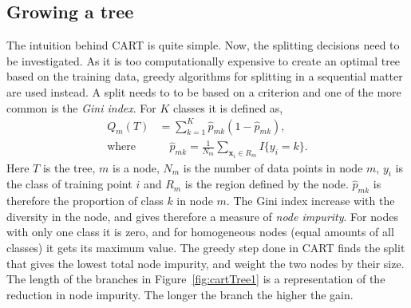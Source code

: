 \subsection{Growing a tree}
\label{sub:Growing a tree}
The intuition behind CART is quite simple. Now, the splitting decisions need to be investigated. As it is too computationally expensive to create an optimal tree based on the training data, greedy algorithms for splitting in a sequential matter are used instead. A split needs to to be based on a criterion and one of the more common is the \textit{Gini index}. For $K$ classes it is defined as,
\begin{align}
  Q_m(T) &= \sum^{K}_{k=1} \hat{p}_{mk} (1 - \hat{p}_{mk}),  \\ 
  \label{eq:pmk} 
  \text{where}& \quad \hat{p}_{mk} = \frac{1}{N_m} \sum_{\mathbf{x}_i \in R_m} I\{y_i = k\}.
\end{align}
Here $T$ is the tree, $m$ is a node, $N_m$ is the number of data points in node $m$, $y_i$ is the class of training point $i$ and $R_m$ is the region defined by the node.
$\hat{p}_{mk}$ is therefore the proportion of class $k$ in node $m$.
The Gini index increase with the diversity in the node, and gives therefore a measure of \textit{node impurity}. For nodes with only one class it is zero, and for homogeneous nodes (equal amounts of all classes) it gets its maximum value. The greedy step done in CART finds the split that gives the lowest total node impurity, and weight the two nodes by their size.  
The length of the branches in Figure~\ref{fig:cartTree1} is a representation of the reduction in node impurity. The longer the branch the higher the gain.

